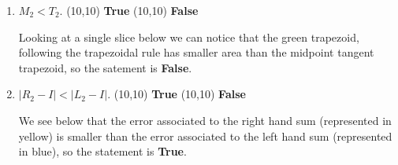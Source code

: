 \documentclass[main]{subfiles}
\begin{document}
\begin{enumerate}
\begin{enumerate}
\begin{enumerate}
    
    \item
    \begin{problem}[1.5in]
    $M_2 < T_2$. \qquad \framebox(10,10){} \textbf{ True} \hspace{0.2in} \framebox(10,10){\solonly{\textcolor{blue}{\checkmark}}} \textbf{ False}
    \end{problem}

    \begin{solution}
    Looking at a single slice below we can notice that the green trapezoid, following the trapezoidal rule has smaller area than the midpoint tangent trapezoid, so the satement is \textbf{False}.
        \begin{center}
\end{center}
    \end{solution}

    \item
    \begin{problem}[1.5in]
    $|R_2-I| < |L_2-I|$. \qquad \framebox(10,10){\solonly{\textcolor{blue}{\checkmark}}} \textbf{ True} \hspace{0.2in} \framebox(10,10){} \textbf{ False}
    \end{problem}

    \begin{solution}
   We see below that the error associated to the right hand sum (represented in yellow) is smaller than the error associated to the left hand sum (represented in blue), so the statement is \textbf{True}.

    \,

    \,
    \vspace{-2in}
     

\end{solution}
\end{enumerate}
\end{enumerate}
\end{enumerate}
\end{document}
